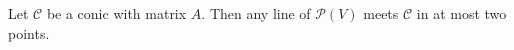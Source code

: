 Let $\mathcal{C}$ be a conic with matrix $A$. Then any line of $\mathcal{P}(V)$ meets $\mathcal{C}$ in at most two points.
